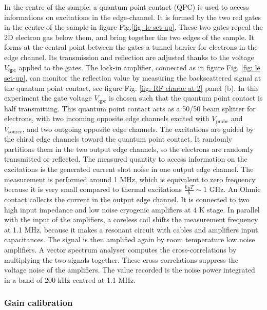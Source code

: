 In the centre of the sample, a quantum point contact (QPC) is used to access informations on excitations in the edge-channel.
It is formed by the two red gates in the centre of the sample in figure Fig.\ref{fig: le set-up}.
These two gates repeal the 2D electron gas below them, and bring together the two edges of the sample.
It forms at the central point between the gates a tunnel barrier for electrons in the edge channel.
Its transmission and reflection are adjusted thanks to the voltage $V_{\mathrm{qpc}}$ applied to the gates.
The lock-in amplifier, connected as in figure Fig. \ref{fig: le set-up}, can monitor the reflection value by measuring the backscattered signal at the quantum point contact, see figure Fig. \ref{fig: RF charac at 2} panel (b).
In this experiment the gate voltage $V_{\mathrm{qpc}}$ is chosen such that the quantum point contact is half transmitting.
This quantum point contact acts as a 50/50 beam splitter for electrons, with two incoming opposite edge channels excited with $V_{\mathrm{probe}}$ and $V_{\mathrm{source}}$, and two outgoing opposite edge channels.
The excitations are guided by the chiral edge channels toward the quantum point contact.
It randomly partitions them in the two output edge channels, so the electrons are randomly transmitted or reflected.
The measured quantity to access information on the excitations is the generated current shot noise in one output edge channel.
The measurement is performed around 1 MHz, which is equivalent to zero frequency because it is very small compared to thermal excitations $\frac{k_{B}T}{h} \sim 1$ GHz.
An Ohmic contact collects the current in the output edge channel.
It is connected to two high input impedance and low noise cryogenic amplifiers \cite{dong2014ultra} at 4 K stage.
In parallel with the input of the amplifiers, a coreless coil shifts the measurement frequency at 1.1 MHz, because it makes a resonant circuit with cables and amplifiers input capacitances.
The signal is then amplified again by room temperature low noise amplifiers.
A vector spectrum analyser computes the cross-correlations by multiplying the two signals together.
These cross correlations suppress the voltage noise of the amplifiers.
The value recorded is the noise power integrated in a band of 200 kHz centred at 1.1 MHz.

\subsubsection*{Gain calibration}

